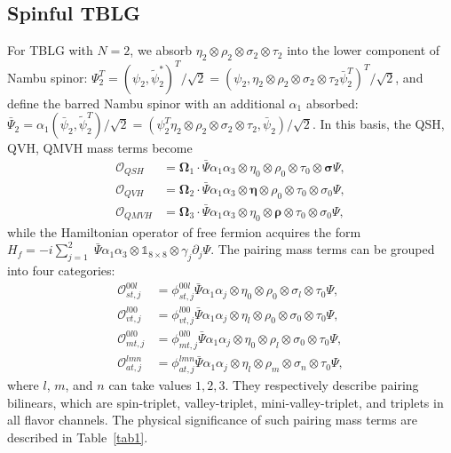 \documentclass[aps,prb,amsmath,amssymb,floatfix,twocolumn]{revtex4}
\begin{document}
\subsection{Spinful TBLG} For TBLG with $N=2$, we absorb $\eta_2\otimes\rho_2\otimes\sigma_2\otimes\tau_2$ into the lower component of Nambu spinor: $\Psi^T_2=(\psi_2,\tilde{\psi}^*_2)^T/\sqrt{2}=(\psi_2,\eta_2\otimes\rho_2\otimes\sigma_2\otimes\tau_2\bar{\psi}^T_2)^T/\sqrt{2}$, and define the barred Nambu spinor with an additional $\alpha_1$ absorbed: $\bar{\Psi}_2=\alpha_1(\bar{\psi}_2,\tilde{\psi}^T_2)/\sqrt{2}=(\psi^T_2\eta_2\otimes\rho_2\otimes\sigma_2\otimes\tau_2,\bar{\psi}_2)/\sqrt{2}$. In this basis, the QSH, QVH, QMVH mass terms become 
\begin{align}
\mathcal{O}_{QSH}&=\mathbf{\Omega}_1 \cdot \bar{\Psi} \alpha_1\alpha_3\otimes\eta_0\otimes\rho_0\otimes\tau_0\otimes\boldsymbol \sigma \Psi, \\
\mathcal{O}_{QVH}&= \mathbf{\Omega}_2 \cdot \bar{\Psi} \alpha_1\alpha_3\otimes \boldsymbol \eta \otimes\rho_0\otimes\tau_0\otimes\sigma_0 \Psi, \\
\mathcal{O}_{QMVH}&= \mathbf{\Omega}_3 \cdot \bar{\Psi} \alpha_1\alpha_3\otimes  \eta_0 \otimes\boldsymbol\rho\otimes\tau_0\otimes\sigma_0 \Psi, 
\end{align}
while the Hamiltonian operator of free fermion acquires the form $H_f= - i \sum_{j=1}^{2} \; \bar{\Psi} \alpha_1\alpha_3 \otimes \mathbb{1}_{8 \times 8} \otimes  \gamma_j \partial_j \Psi$. The pairing mass terms can be grouped into four categories: 
\begin{align}
 \mathcal{O}_{st,j}^{00l}&=\phi_{st,j}^{00l} \bar{\Psi} \alpha_1\alpha_j  \otimes \eta_0 \otimes \rho_0 \otimes \sigma_l \otimes \tau_0 \Psi, \\
 \mathcal{O}_{vt,j}^{l00}&=\phi_{vt,j}^{l00} \bar{\Psi} \alpha_1\alpha_j  \otimes \eta_l \otimes \rho_0 \otimes \sigma_0 \otimes \tau_0 \Psi, \\
 \mathcal{O}_{mt,j}^{0l0}&=\phi_{mt,j}^{0l0} \bar{\Psi} \alpha_1\alpha_j  \otimes \eta_0 \otimes \rho_l \otimes \sigma_0 \otimes \tau_0 \Psi, \\
 \mathcal{O}_{at,j}^{lmn}&=\phi_{at,j}^{lmn} \bar{\Psi} \alpha_1\alpha_j  \otimes \eta_l \otimes \rho_m \otimes \sigma_n \otimes\tau_0 \Psi,
 \end{align} 
where $l$, $m$, and $n$ can take values $1,2,3$. They respectively describe pairing bilinears, which are spin-triplet, valley-triplet, mini-valley-triplet, and triplets in all flavor channels. The physical significance of such pairing mass terms are described in Table~\ref{tab1}.
\end{document}
